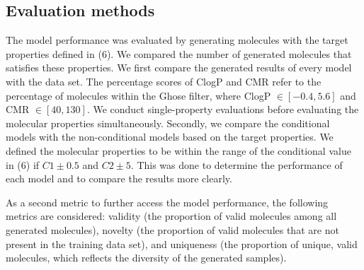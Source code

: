 \subsection{Evaluation methods}
The model performance was evaluated by generating molecules with the target properties defined in (6). We  compared the number of generated molecules that satisfies these properties. We first compare the generated results of every model with the data set. The percentage scores of ClogP and CMR refer to the percentage of molecules within the Ghose filter, where ClogP $\in [-0.4, 5.6]$ and CMR $\in [40, 130]$. We conduct single-property evaluations before evaluating the molecular properties simultaneously. Secondly, we compare the conditional models with the non-conditional models based on the target properties. We defined the molecular properties to be within the range of the conditional value in (6) if $C1 \pm 0.5$ and $C2 \pm 5$. This was done to determine the performance of each model and to compare the results more clearly.

As a second metric to further access the model performance, the following metrics are considered: validity (the proportion of valid molecules among all generated molecules), novelty (the proportion of valid molecules that are not present in the training data set), and uniqueness (the proportion of unique, valid molecules, which reflects the diversity of the generated samples). 
